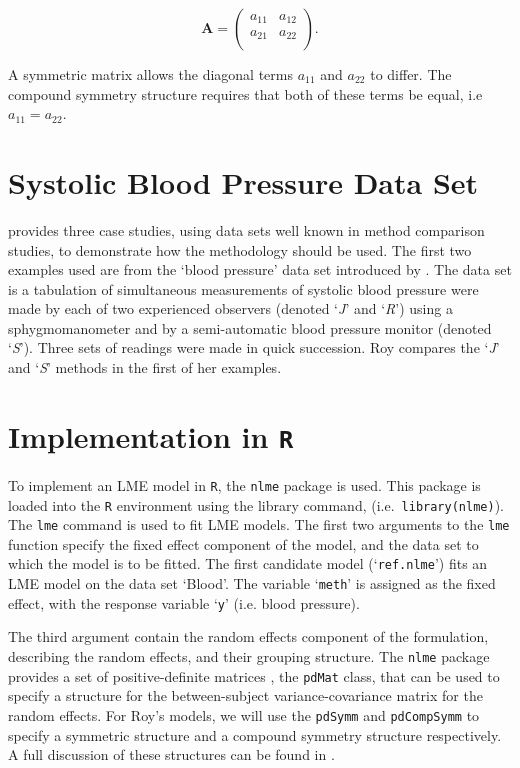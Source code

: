 \[
\boldsymbol{A} = \left( \begin{array}{cc}
a_{11} & a_{12}  \\
a_{21} & a_{22}  \\
\end{array}\right).
\]

A symmetric matrix allows the diagonal terms $a_{11}$ and $a_{22}$ to differ. The compound symmetry structure requires that both of these terms be equal, i.e $a_{11} = a_{22}$.






\section{Systolic Blood Pressure Data Set}

\citet{ARoy2009} provides three case studies, using data sets well known in method comparison studies, to demonstrate how the methodology should be used. The first two examples used are from the `blood pressure' data set introduced by \citet{BA99}. The data set is a tabulation of simultaneous measurements of systolic blood pressure were made by each of two experienced observers (denoted `\textit{J}' and `\textit{R}') using a sphygmomanometer and by a semi-automatic blood pressure monitor (denoted `\textit{S}'). Three sets of readings were made in quick succession. Roy compares the `\textit{J}' and `\textit{S}' methods in the first of her examples.

\section{Implementation in \texttt{R}}
To implement an LME model in \texttt{R}, the \texttt{nlme} package is used. This package is loaded into the \texttt{R} environment using the library command, (i.e.\ \texttt{library(nlme)}). The \texttt{lme} command is used to fit LME models. The first two arguments to the \texttt{lme} function specify the fixed effect component of the model, and the data set to which the model is to be fitted. The first candidate model (`\texttt{ref.nlme}') fits an LME model on the data set `Blood'. The variable `\texttt{meth}' is assigned as the fixed effect, with the response variable `\texttt{y}' (i.e. blood pressure).

The third argument contain the random effects component of the formulation, describing the random effects, and their grouping structure. The \texttt{nlme} package provides a set of positive-definite matrices , the \texttt{pdMat} class, that can be used to specify a structure for the between-subject variance-covariance matrix for the random effects. For Roy's models, we will use the \texttt{pdSymm} and \texttt{pdCompSymm} to specify a symmetric structure and a compound symmetry structure respectively. A full discussion of these structures can be found in \citet[pg. 158]{PB}.

